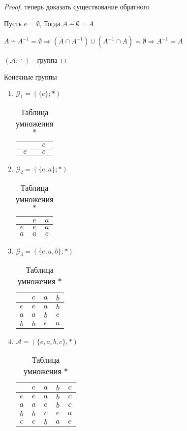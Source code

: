 \documentclass[../main/document.tex]{subfiles}
\begin{document}
\begin{exm}
\begin{proof}
теперь доказать существование обратного

Пусть $e=\emptyset$, Тогда $A\dotminus \emptyset=A$

$A\dotminus A^{-1}=\emptyset\Rightarrow (\overline{A}\cap A^{-1})\cup (\overline{A^{-1}}\cap A)=\emptyset\Rightarrow A^{-1}=A$

$(\mathcal{A};\dotminus)$ - группа
\end{proof}
\end{exm}
\begin{exm}
Конечные группы
\begin{enumerate}
\item $\mathcal{G}_1=(\{e\};*)$
\begin{table}[h]
\centering
\caption*{Таблица умножения $*$}
\renewcommand*{\arraystretch}{1.4}
\begin{tabular}{c|c}
  & $e$  \\ \hline
$e$ & $e$ \\

\end{tabular}
\end{table}
\item $\mathcal{G}_2=(\{e,a\};*)$
\begin{table}[H]
\centering
\caption*{Таблица умножения $*$}
\renewcommand*{\arraystretch}{1.4}
\begin{tabular}{c|c|c}
  & $e$ & $a$   \\ \hline
$e$ & $e$ & $a$  \\ \hline
$a$ & $a$ & $e$ \\
\end{tabular}
\end{table}
\item $\mathcal{G}_3=(\{e,a,b\};*)$
\begin{table}[H]
\centering
\caption*{Таблица умножения $*$}
\renewcommand*{\arraystretch}{1.4}
\begin{tabular}{c|c|c|c}
  & $e$ & $a$  &$b$  \\ \hline
$e$ & $e$ & $a$ &$b$ \\ \hline
$a$ & $a$ & $b$ &$e$ \\ \hline
$b$ & $b$ & $e$ & $a$\\
\end{tabular}
\end{table}
\item $\mathcal{A}=(\{e,a,b,c\},*)$
\begin{table}[h]
\centering
\caption*{Таблица умножения $*$}
\renewcommand*{\arraystretch}{1.4}
\begin{tabular}{c|c|c|c|c}
  & $e$ & $a$ & $b$ & $c$ \\ \hline
$e$ & $e$ & $a$ & $b$ & $c$ \\ \hline
$a$ & $a$ & $e$ & $b$ & $c$ \\ \hline
$b$ & $b$ & $c$ & $e$ & $a$ \\ \hline
$c$ & $c$ & $b$& $a$ & $e$ \\ 
\end{tabular}
\end{table}
\end{enumerate}
\end{exm}
\end{document}
